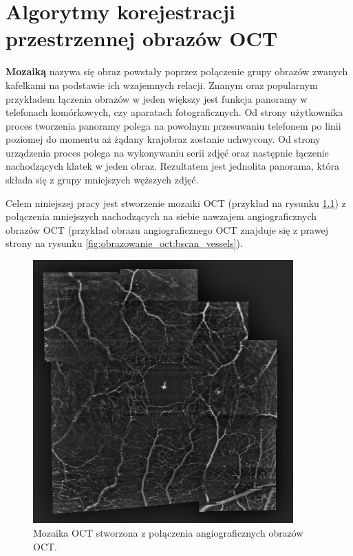 %
\chapter{Algorytmy korejestracji przestrzennej obrazów OCT}
\label{sec:algorytmy_korejestracji}

\textbf{Mozaiką} nazywa się obraz powstały poprzez połączenie grupy obrazów zwanych kafelkami na podstawie ich wzajemnych relacji. Znanym oraz popularnym przykładem łączenia obrazów w jeden większy jest funkcja panoramy w telefonach komórkowych, czy aparatach fotograficznych. Od strony użytkownika proces tworzenia panoramy polega na powolnym przesuwaniu telefonem po linii poziomej do momentu aż żądany krajobraz zostanie uchwycony. Od strony urządzenia proces polega na wykonywaniu serii zdjęć oraz następnie łączenie nachodzących klatek w jeden obraz. Rezultatem jest jednolita panorama, która składa się z grupy mniejszych węższych zdjęć.

Celem niniejszej pracy jest stworzenie mozaiki OCT (przykład na rysunku \ref{fig:algorytmy_korejestracji:mosaic}) z połączenia mniejszych nachodzących na siebie nawzajem angiograficznych obrazów OCT (przykład obrazu angiograficznego OCT znajduje się z prawej strony na rysunku \ref{fig:obrazowanie_oct:bscan_vessels}).

\begin{figure}[H]
  \centering
  \includegraphics[width=10cm]{gfx/mosaic}
  \caption{Mozaika OCT stworzona z połączenia angiograficznych obrazów OCT.}
  \label{fig:algorytmy_korejestracji:mosaic}
\end{figure}

